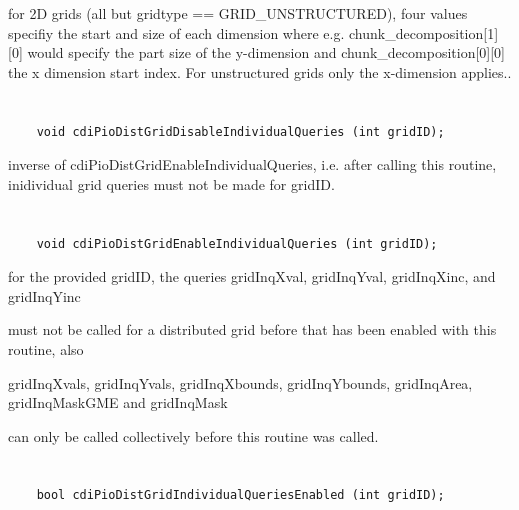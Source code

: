 for 2D grids (all but gridtype == GRID_UNSTRUCTURED), four values specifiy the start and size of each dimension
where e.g. chunk_decomposition[1][0] would
specify the part size of the y-dimension and chunk_decomposition[0][0] the x dimension start
index. For unstructured grids only the x-dimension applies..


\section*{\tt {}}

\begin{verbatim}
    void cdiPioDistGridDisableIndividualQueries (int gridID);
\end{verbatim}

inverse of
cdiPioDistGridEnableIndividualQueries, i.e. after calling this
routine, inidividual grid queries must not be made for gridID.


\section*{\tt {}}

\begin{verbatim}
    void cdiPioDistGridEnableIndividualQueries (int gridID);
\end{verbatim}

for the provided gridID, the
queries
gridInqXval, gridInqYval, gridInqXinc, and gridInqYinc

must not be called for a distributed grid before that has been
enabled with this routine, also

gridInqXvals, gridInqYvals, gridInqXbounds, gridInqYbounds,
gridInqArea, gridInqMaskGME and gridInqMask

can only be called collectively before this routine was
called.


\section*{\tt {}}

\begin{verbatim}
    bool cdiPioDistGridIndividualQueriesEnabled (int gridID);
\end{verbatim}

